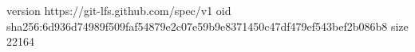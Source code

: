 version https://git-lfs.github.com/spec/v1
oid sha256:6d936d74989f509faf54879e2c07e59b9e8371450c47df479ef543bef2b086b8
size 22164
